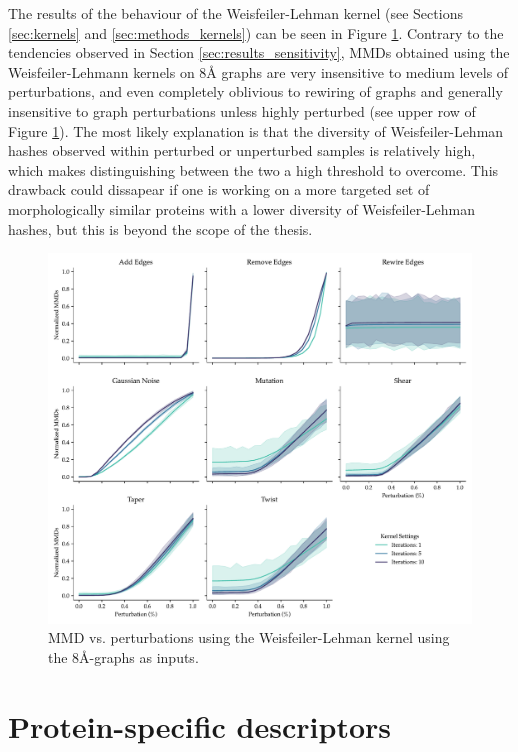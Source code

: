 The results of the behaviour of the Weisfeiler-Lehman kernel (see Sections
\ref{sec:kernels} and \ref{sec:methods_kernels}) can be seen in Figure
\ref{fig:wlk}. Contrary to the tendencies observed in Section
\ref{sec:results_sensitivity}, MMDs obtained using the Weisfeiler-Lehmann
kernels on 8\si{\angstrom} graphs are very insensitive to medium levels of perturbations,
and even completely oblivious to rewiring of graphs and generally insensitive to
graph perturbations unless highly perturbed (see upper row of Figure \ref{fig:wlk}). The most likely explanation
is that the diversity of Weisfeiler-Lehman hashes observed within perturbed or
unperturbed samples is relatively high, which makes distinguishing between the
two a high threshold to overcome. This drawback could dissapear if one is working on
a more targeted set of morphologically similar proteins with a lower diversity
of Weisfeiler-Lehman hashes, but this is beyond the scope of the thesis.

\begin{figure}
  \includegraphics[width=\textwidth]{./figures/results/res_3.pdf}
  \caption[MMD vs. perturbations using the Weisfeiler-Lehman kernel.]{MMD vs.
    perturbations using the Weisfeiler-Lehman kernel using the
    8\si{\angstrom}-graphs as inputs.}
  \label{fig:wlk}
\end{figure}

\section{Protein-specific descriptors}

